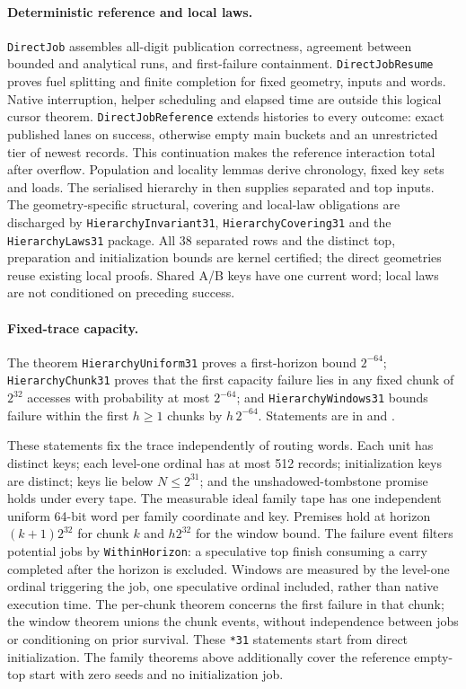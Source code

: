 \documentclass[11pt]{article}
\theoremstyle{definition}
\theoremstyle{remark}
\begin{document}
\paragraph{Deterministic reference and local laws.}
\texttt{DirectJob} assembles all-digit publication correctness, agreement
between bounded and analytical runs, and first-failure containment.
\texttt{DirectJobResume} proves fuel splitting and finite completion for fixed
geometry, inputs and words. Native interruption, helper scheduling and elapsed
time are outside this logical cursor theorem. \texttt{DirectJobReference}
extends histories to every outcome: exact published lanes on success,
otherwise empty main buckets and an unrestricted tier of newest records.
This continuation makes the reference interaction total after overflow.
Population and locality lemmas derive chronology, fixed key sets and loads.
The serialised hierarchy in 
then supplies separated and top inputs. The geometry-specific structural,
covering and local-law obligations are discharged by
\texttt{HierarchyInvariant31}, \texttt{HierarchyCovering31} and the
\texttt{HierarchyLaws31} package. All 38 separated rows and the distinct top,
preparation and initialization bounds are kernel certified; the direct
geometries reuse existing local proofs. Shared A/B keys have one current word;
local laws are not conditioned on preceding success.

\paragraph{Fixed-trace capacity.}
The theorem \texttt{HierarchyUniform31} proves a first-horizon bound $2^{-64}$;
\texttt{HierarchyChunk31} proves that the first capacity failure lies in any
fixed chunk of $2^{32}$ accesses with probability at most $2^{-64}$; and
\texttt{HierarchyWindows31} bounds failure within the first $h\ge1$ chunks
by $h\,2^{-64}$. Statements are in
 and
.

These statements fix the trace independently of routing words. Each unit has
distinct keys; each level-one ordinal has at most 512 records; initialization
keys are distinct; keys lie below $N\le2^{31}$; and the unshadowed-tombstone
promise holds under every tape. The measurable ideal family tape has one
independent uniform 64-bit word per family coordinate and key. Premises hold
at horizon $(k+1)2^{32}$ for chunk $k$ and $h2^{32}$ for the window bound.
The failure event filters potential jobs by \texttt{WithinHorizon}: a
speculative top finish consuming a carry completed after the horizon is
excluded. Windows are measured by the level-one ordinal triggering the job,
one speculative ordinal included, rather than native execution time.
The per-chunk theorem concerns the first failure in that chunk; the window
theorem unions the chunk events, without independence between jobs or
conditioning on prior survival. These \texttt{*31} statements start
from direct initialization. The family theorems above additionally cover the
reference empty-top start with zero seeds and no initialization job.
\end{document}
